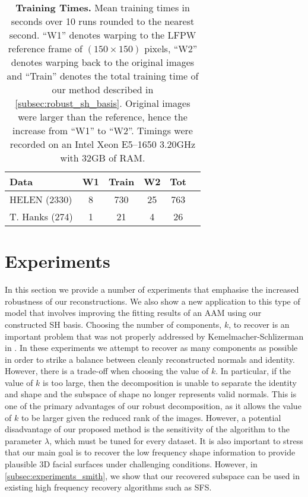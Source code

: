 \begin{table}[th]
    \centering
    \begin{tabular}{lccccc}
        \toprule
        Data   & W1 & Train & W2 & Tot \\ \midrule
        HELEN (2330)    & 8       & 730       & 25        & 763   \\
        T. Hanks (274)  & 1       & 21        & 4         & 26    \\  \bottomrule
    \end{tabular}
    \caption{\textbf{Training Times.} Mean training times in seconds over 10
             runs rounded to the nearest second. ``W1'' denotes warping to the
             LFPW reference frame of $(150 \times 150)$ pixels, ``W2'' denotes
             warping back to the original images and ``Train'' denotes the total
             training time of our method described in
             \cref{subsec:robust_sh_basis}. Original images were larger than 
             the reference, hence the increase from ``W1'' to ``W2''. Timings
             were recorded on an Intel Xeon E5--1650 3.20GHz with 32GB of RAM.}
\label{tbl:timings}
\end{table}
\section{Experiments}\label{sec:imag_coll_experiments}
In this section we provide a number of experiments that emphasise the increased
robustness of our reconstructions. We also show a new application to this type
of model that involves improving the fitting results of an AAM using our
constructed SH basis. Choosing the number of components, $k$, to recover is an
important problem that was not properly addressed by Kemelmacher-Schlizerman in
\cite{KemelmacherShlizerman:2013iv}. In these experiments we attempt to recover as many
components as possible in order to strike a balance between cleanly
reconstructed normals and identity. However, there is a trade-off when choosing
the value of $k$. In particular, if the value of $k$ is too large, then the
decomposition is unable to separate the identity and shape and the subspace of
shape no longer represents valid normals. This is one of the primary advantages
of our robust decomposition, as it allows the value of $k$ to be larger given
the reduced rank of the images. However, a potential disadvantage of our
proposed method is the sensitivity of the algorithm to the parameter $\lambda$,
which must be tuned for every dataset. It is also important to stress that our
main goal is to recover the low frequency shape information to provide plausible
3D facial surfaces under challenging conditions. However, in
\cref{subsec:experiments_smith}, we show that our recovered subspace can
be used in existing high frequency recovery algorithms such as SFS.\@

